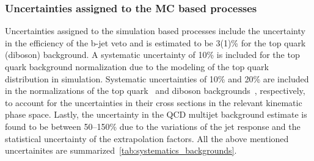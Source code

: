 \subsubsection{Uncertainties assigned to the MC based processes}

Uncertainties assigned to the simulation based processes include
the uncertainty in the efficiency of the b-jet 
veto and is estimated to be 3(1)\% for the top quark (diboson) background. 
A systematic uncertainty of 10\% is included for the top quark background 
normalization  due to the modeling of the top quark \pt distribution in simulation. 
Systematic uncertainties of 10\% and 20\% are included in the normalizations of the 
top quark~\cite{Khachatryan:2015uqb} and diboson backgrounds~\cite{Khachatryan:2016txa,Khachatryan:2016tgp}, 
respectively, to account for the uncertainties in their cross sections in the relevant 
kinematic phase space. Lastly, the uncertainty in the QCD multijet background estimate
is found to be between 50--150\% due to the variations of the jet response and the
statistical uncertainty of the extrapolation factors.
All the above mentioned uncertainites are summarized~\ref{tab:systematics_backgrounds}.


